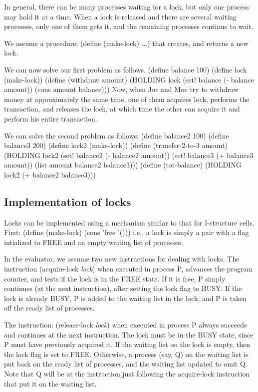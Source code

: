 In general, there can be many processes waiting for a lock, but only one
process may hold it at a time.  When a lock is released and there are
several waiting processes, only one of them gets it, and the remaining
processes continue to wait.

We assume a procedure:
\beginlisp
(define (make-lock) ...)
\endlisp
that creates, and returns a new lock.

We can now solve our first problem as follows.
\beginlisp
(define balance 100)
(define lock (make-lock))
\null
(define (withdraw amount)
    (HOLDING lock
       (set! balance (- balance amount))
       (cons amount balance)))
\endlisp
 Now, when Joe and Moe try to withdraw money at approximately the same time,
one of them acquires {\cf lock}, performs the transaction,  and releases
the lock, at which time the other can acquire it and perform his entire
transaction.

We can solve the second problem as follows:
\beginlisp
(define balance2 100)
(define balance3 200)
(define lock2 (make-lock))
\null
(define (transfer-2-to-3 amount)
  (HOLDING lock2
    (set! balance2 (- balance2 amount))
    (set! balance3 (+ balance3 amount))
    (list amount balance2 balance3)))
\null
(define (tot-balance)
  (HOLDING lock2
    (+ balance2 balance3)))
\endlisp

\subsection{Implementation of locks}

Locks can be implemented using a mechanism similar to that for I-structure
cells.  First:
\beginlisp
(define (make-lock) (cons 'free '()))
\endlisp
i.e., a lock is simply a pair with a flag intialized to {\cf FREE} and an
empty waiting list of processes.

In the evaluator, we assume two new instructions for dealing with locks.  The
instruction
\beginlisp
(acquire-lock {\em lock\/})
\endlisp
when executed in process P, advances the program counter, and tests if the
lock is in the {\cf FREE} state.  If it is free, P simply continues (at
the next instruction), after setting the lock flag to {\cf BUSY}.  If the lock is
already {\cf BUSY},  P is added to the waiting list in the lock, and P is
taken off the ready list of processes.

The instruction:
\beginlisp
(release-lock {\em lock\/})
\endlisp
 when executed in process P always succeeds and continues at the next
instruction.  The lock must be in the {\cf BUSY} state, since P must have
previously acquired it.  If the waiting list on the lock is empty, then the
lock flag is set to {\cf FREE}. Otherwise, a process (say, Q) on the
waiting list is put back on the ready list of processes, and the waiting
list updated to omit Q.  Note that Q will be at the instruction just
following the {\cf acquire-lock} instruction that put it on the waiting list.

